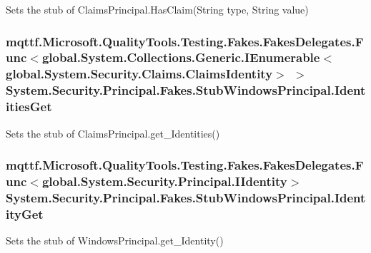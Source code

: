 Sets the stub of Claims\-Principal.\-Has\-Claim(\-String type, String value)

\hypertarget{class_system_1_1_security_1_1_principal_1_1_fakes_1_1_stub_windows_principal_a1a0ef38803110d5320a7f306072d8606}{
\subsubsection[{Identities\-Get}]{\setlength{\rightskip}{0pt plus 5cm}mqttf.\-Microsoft.\-Quality\-Tools.\-Testing.\-Fakes.\-Fakes\-Delegates.\-Func$<$global.\-System.\-Collections.\-Generic.\-I\-Enumerable$<$global.\-System.\-Security.\-Claims.\-Claims\-Identity$>$ $>$ System.\-Security.\-Principal.\-Fakes.\-Stub\-Windows\-Principal.\-Identities\-Get}}\label{class_system_1_1_security_1_1_principal_1_1_fakes_1_1_stub_windows_principal_a1a0ef38803110d5320a7f306072d8606}


Sets the stub of Claims\-Principal.\-get\-\_\-\-Identities()

\hypertarget{class_system_1_1_security_1_1_principal_1_1_fakes_1_1_stub_windows_principal_a67ea0acc58563de8fdec8e5cfc05a758}{
\subsubsection[{Identity\-Get}]{\setlength{\rightskip}{0pt plus 5cm}mqttf.\-Microsoft.\-Quality\-Tools.\-Testing.\-Fakes.\-Fakes\-Delegates.\-Func$<$global.\-System.\-Security.\-Principal.\-I\-Identity$>$ System.\-Security.\-Principal.\-Fakes.\-Stub\-Windows\-Principal.\-Identity\-Get}}\label{class_system_1_1_security_1_1_principal_1_1_fakes_1_1_stub_windows_principal_a67ea0acc58563de8fdec8e5cfc05a758}


Sets the stub of Windows\-Principal.\-get\-\_\-\-Identity()

